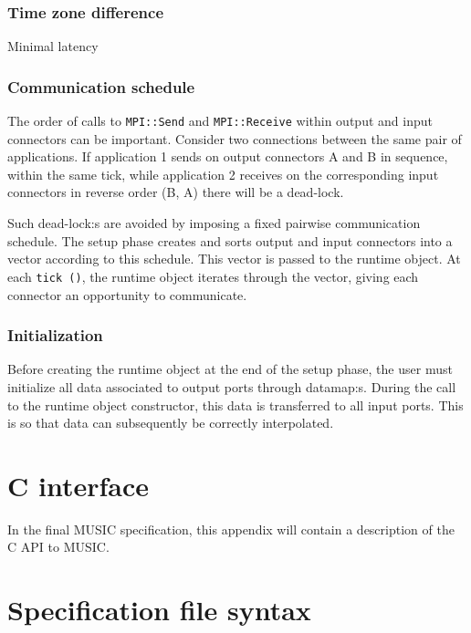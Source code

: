 \documentclass[a4paper]{report}
\begin{document}
\begin{metatext}
\subsection{Time zone difference}

Minimal latency

\subsection{Communication schedule}

The order of calls to \lstinline|MPI::Send| and \lstinline|MPI::Receive| within
output and input connectors can be important.  Consider two
connections between the same pair of applications.  If application 1
sends on output connectors A and B in sequence, within the same tick,
while application 2 receives on the corresponding input connectors in
reverse order (B, A) there will be a dead-lock.

Such dead-lock:s are avoided by imposing a fixed pairwise
communication schedule.  The setup phase creates and sorts output and
input connectors into a vector according to this schedule.  This
vector is passed to the runtime object.  At each \lstinline|tick ()|, the
runtime object iterates through the vector, giving each connector an
opportunity to communicate.

\subsection{Initialization}

Before creating the runtime object at the end of the setup phase, the
user must initialize all data associated to output ports through
datamap:s.  During the call to the runtime object constructor, this
data is transferred to all input ports.  This is so that data can
subsequently be correctly interpolated.
\end{metatext}

\appendix

\chapter{C interface}

In the final MUSIC specification, this appendix will contain a
description of the C API to MUSIC.


\chapter{Specification file syntax}
\label{sec:specsyntax}
\end{document}

